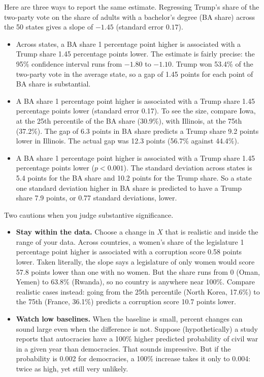 \documentclass[11pt]{article}
\begin{document}
Here are three ways to report the same estimate. Regressing Trump's share of the two-party vote on
the share of adults with a bachelor's degree (BA share) across the 50 states gives a slope of
$-1.45$ (standard error $0.17$).
\begin{itemize}
\item Across states, a BA share 1 percentage point higher is associated with a Trump share
  1.45 percentage points lower. The estimate is fairly precise: the 95\% confidence interval runs
  from $-1.80$ to $-1.10$. Trump won 53.4\% of the two-party vote in the average state, so a gap
  of 1.45 points for each point of BA share is substantial.
\item A BA share 1 percentage point higher is associated with a Trump share 1.45 percentage points
  lower (standard error 0.17). To see the size, compare Iowa, at the 25th percentile of the BA
  share (30.9\%), with Illinois, at the 75th (37.2\%). The gap of 6.3 points in BA share predicts
  a Trump share 9.2 points lower in Illinois. The actual gap was 12.3 points (56.7\% against
  44.4\%).
\item A BA share 1 percentage point higher is associated with a Trump share 1.45 percentage points
  lower ($p < 0.001$). The standard deviation across states is 5.4 points for the BA share and
  10.2 points for the Trump share. So a state one standard deviation higher in BA share is
  predicted to have a Trump share 7.9 points, or 0.77 standard deviations, lower.
\end{itemize}

Two cautions when you judge substantive significance.
\begin{itemize}
\item \textbf{Stay within the data.} Choose a change in $X$ that is realistic and inside the range
  of your data. Across countries, a women's share of the legislature 1 percentage point higher is
  associated with a corruption score 0.58 points lower. Taken literally, the slope says a
  legislature of only women would score 57.8 points lower than one with no women. But the share
  runs from 0 (Oman, Yemen) to 63.8\% (Rwanda), so no country is anywhere near 100\%. Compare
  realistic cases instead: going from the 25th percentile (North Korea, 17.6\%) to the 75th
  (France, 36.1\%) predicts a corruption score 10.7 points lower.
\item \textbf{Watch low baselines.} When the baseline is small, percent changes can sound large
  even when the difference is not. Suppose (hypothetically) a study reports that autocracies have a
  100\% higher predicted probability of civil war in a given year than democracies. That sounds
  impressive. But if the probability is 0.002 for democracies, a 100\% increase takes it only to
  0.004: twice as high, yet still very unlikely.
\end{itemize}
\end{document}
